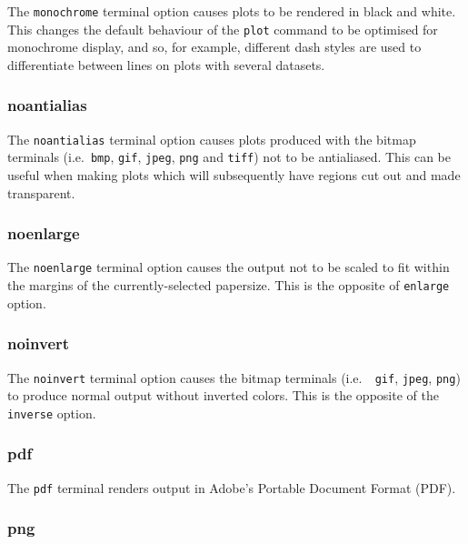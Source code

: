 The {\tt monochrome} terminal option causes plots to be rendered in black and
white. This changes the default behaviour of the {\tt plot} command to be
optimised for monochrome display, and so, for example, different dash styles
are used to differentiate between lines on plots with several datasets.


\subsubsection{noantialias}

The {\tt noantialias} terminal option causes plots produced with the bitmap
terminals (i.e.\ {\tt bmp}, {\tt gif}, {\tt jpeg}, {\tt png} and {\tt tiff})
not to be antialiased. This can be useful when making plots which will
subsequently have regions cut out and made transparent.


\subsubsection{noenlarge}

The {\tt noenlarge} terminal option causes the output not to be scaled to fit
within the margins of the currently-selected papersize. This is the opposite of
{\tt enlarge} option.


\subsubsection{noinvert}

The {\tt noinvert} terminal option causes the bitmap terminals (i.e.\ {\tt
gif}, {\tt jpeg}, {\tt png}) to produce normal output without inverted colors.
This is the opposite of the {\tt inverse} option.


\subsubsection{pdf}

The {\tt pdf} terminal renders output in Adobe's Portable Document Format
(PDF).


\subsubsection{png}

